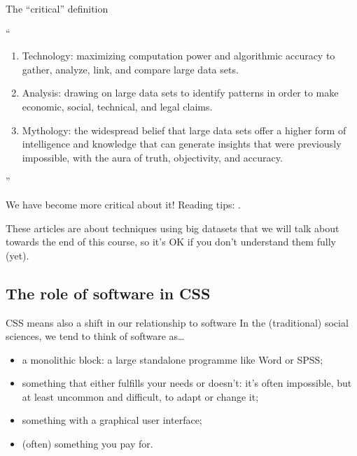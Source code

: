 \begin{frame}{The ``critical'' definition }
	\begin{block}{\textcite{boyd2012}}
		``
		\begin{enumerate}
			\item Technology: maximizing computation power and algorithmic accuracy to gather, analyze, link, and compare large data sets.
			\item Analysis: drawing on large data sets to identify patterns in order to make economic, social, technical, and legal claims.
			\item Mythology: the widespread belief that large data sets offer a higher form of intelligence and knowledge that can generate insights that were previously impossible, with the aura of truth, objectivity, and accuracy.
		\end{enumerate}
		''
	\end{block}
\end{frame}






\begin{frame}{We have become more critical about it!}
	Reading tips: \textcite{Bender2021, Bolukbasi2016}.
	
	These articles are about techniques using big datasets that we will talk about towards the end of this course, so it's OK if you don't understand them fully (yet).
\end{frame}







\subsection{The role of software in CSS}

\begin{frame}{CSS means also a shift in our relationship to software}
	In the (traditional) social sciences, we tend to think of software as\ldots
\begin{itemize}
	\item a monolithic block: a large standalone programme like Word or SPSS;
	\item something that either fulfills your needs or doesn't: it's often impossible, but at least uncommon and difficult, to adapt or change it;
	\item something with a graphical user interface;
	\item (often) something you pay for.
\end{itemize}
\end{frame}



